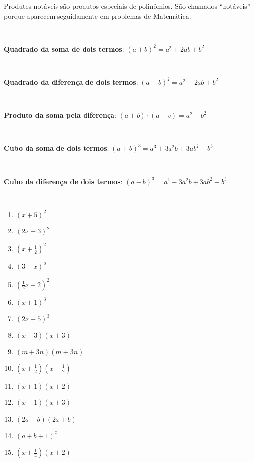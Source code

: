 Produtos notáveis são produtos especiais de polinômios. São chamados “notáveis” porque aparecem seguidamente em problemas de Matemática.

~~

\textbf{Quadrado da soma de dois termos}: $(a+b)^2 = a^2 + 2ab + b^2$

~~

\textbf{Quadrado da diferença de dois termos}: $(a - b)^2 = a^2 - 2ab + b^2$

~~

\textbf{Produto da soma pela diferença}: $(a + b) \cdot (a - b) = a^2 - b^2$

~~

\textbf{Cubo da soma de dois termos}: $(a + b)^3 = a^3 + 3a^2b + 3ab^2 + b^3$

~~

\textbf{Cubo da diferença de dois termos}: $(a - b)^3 = a^3 - 3a^2b + 3ab^2 - b^3$

~~

\begin{exercicios}
\begin{enumerate}[label=\alph*)]
        \item $(x+5)^2$
    
    \item $(2x-3)^2$
    
    \item $(x+\frac{1}{2})^2$
    
    \item $(3-x)^2$
    
    \item $(\frac{1}{2}x+2)^2$
    
    \item $(x+1)^3$
    
    \item $(2x-5)^3$
    
    \item $(x-3)(x+3)$
    
    \item $(m+3n)(m+3n)$
    
    \item $(x+\frac{1}{2})(x-\frac{1}{2})$
    
    \item $(x+1)(x+2)$
    
    \item $(x-1)(x+3)$
    
    \item $(2a-b)(2a+b)$
    
    \item $(a+b+1)^2$
    
    \item $(x+\frac{1}{4})(x+2)$
\end{enumerate}
\end{exercicios}


